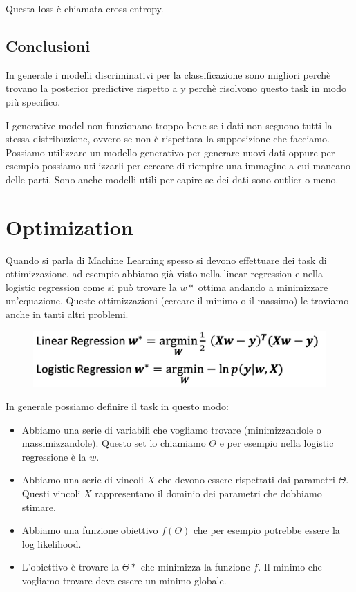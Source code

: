 \documentclass[14pt]{extreport}
\begin{document}
Questa loss è chiamata cross entropy.

\section{Conclusioni}

In generale i modelli discriminativi per la classificazione sono migliori perchè trovano la posterior predictive rispetto a y perchè risolvono questo
task in modo più specifico.

I generative model non funzionano troppo bene se i dati non seguono tutti la stessa distribuzione, ovvero se non è rispettata la supposizione che
facciamo. Possiamo utilizzare un modello generativo per generare nuovi dati oppure per esempio possiamo utilizzarli per cercare di riempire una
immagine a cui mancano delle parti. Sono anche modelli utili per capire se dei dati sono outlier o meno.

\chapter{Optimization}

Quando si parla di Machine Learning spesso si devono effettuare dei task di ottimizzazione, ad esempio abbiamo già visto nella linear regression e
nella logistic regression come si può trovare la $w*$ ottima andando a minimizzare un'equazione. Queste ottimizzazioni (cercare il minimo o il
massimo) le troviamo anche in tanti altri problemi.

\begin{figure}[H]
	\centering
	\includegraphics[width=0.7\linewidth]{215.jpeg}
\end{figure}

In generale possiamo definire il task in questo modo:

\begin{itemize}
	\item Abbiamo una serie di variabili che vogliamo trovare (minimizzandole o massimizzandole). Questo set lo chiamiamo $\Theta$ e per esempio nella
	logistic regressione è la $w$.
	\item Abbiamo una serie di vincoli $X$ che devono essere rispettati dai parametri $\Theta$. Questi vincoli $X$ rappresentano il dominio dei
	parametri che dobbiamo stimare.
	\item Abbiamo una funzione obiettivo $f(\Theta)$ che per esempio potrebbe essere la log likelihood.
	\item L'obiettivo è trovare la $\Theta*$ che minimizza la funzione $f$. Il minimo che vogliamo trovare deve essere un minimo globale.
\end{itemize}
\end{document}
